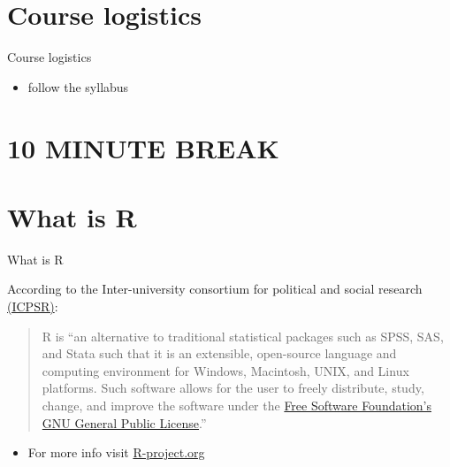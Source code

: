 \documentclass[
  8pt,
  ignorenonframetext,
  dvipsnames]{beamer}
\providecommand{\tightlist}{%
  \setlength{\itemsep}{0pt}\setlength{\parskip}{0pt}}
\let\olditem\item
\renewcommand{\item}{%
  \olditem\vspace{4pt}
}
\begin{document}
\hypertarget{course-logistics}{%
\section{Course logistics}\label{course-logistics}}

\begin{frame}{Course logistics}
\protect\hypertarget{course-logistics-1}{}

\begin{itemize}
\tightlist
\item
  follow the syllabus
\end{itemize}

\end{frame}

\hypertarget{minute-break}{%
\section{10 MINUTE BREAK}\label{minute-break}}

\hypertarget{what-is-r}{%
\section{What is R}\label{what-is-r}}

\begin{frame}{What is R}
\protect\hypertarget{what-is-r-1}{}

According to the Inter-university consortium for political and social
research
\href{https://www.icpsr.umich.edu/icpsrweb/content/shared/ICPSR/faqs/what-is-r.html}{(ICPSR)}:

\begin{quote}
R is ``an alternative to traditional statistical packages such as SPSS,
SAS, and Stata such that it is an extensible, open-source language and
computing environment for Windows, Macintosh, UNIX, and Linux platforms.
Such software allows for the user to freely distribute, study, change,
and improve the software under the
\href{https://www.gnu.org/home.en.html}{Free Software Foundation's GNU
General Public License}.''
\end{quote}

\begin{itemize}
\tightlist
\item
  For more info visit
  \href{https://www.r-project.org/about.html}{R-project.org}
\end{itemize}

\end{frame}
\end{document}
